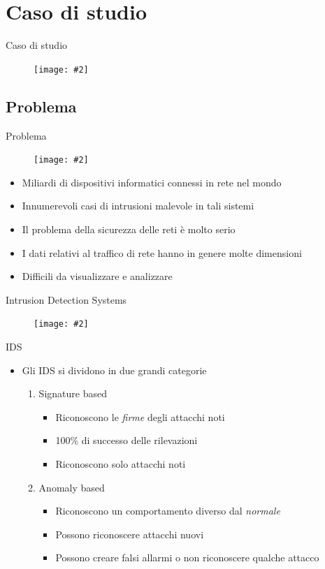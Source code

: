 \documentclass[xcolor={dvipsnames}]{beamer}
\newcommand{\figcen}[2]{
	\begin{figure}
		\begin{center}
			\texttt{[image: \#2]}
		\end{center}
	\end{figure}
}
\begin{document}
\section{Caso di studio}

	\begin{frame}{Caso di studio}
		\figcen{.85\textwidth}{caso}
	\end{frame}

	\subsection{Problema}

		\begin{frame}{Problema}
			\figcen{.5\textwidth}{iot}
			\begin{itemize}
				\item Miliardi di dispositivi informatici connessi in rete nel mondo
				\item Innumerevoli casi di intrusioni malevole in tali sistemi
				\item Il problema della sicurezza delle reti è molto serio
				\item I dati relativi al traffico di rete hanno in genere molte dimensioni
				\item Difficili da visualizzare e analizzare
			\end{itemize}
		\end{frame}
		
		\begin{frame}{Intrusion Detection Systems}
			\figcen{.5\textwidth}{guardia}
		\end{frame}

		\begin{frame}{IDS}
			\begin{itemize}
				\item Gli IDS si dividono in due grandi categorie\\
				\begin{enumerate}
					\item Signature based
					\begin{itemize}
						\item Riconoscono le \emph{firme} degli attacchi noti
						\item 100\% di successo delle rilevazioni
						\item Riconoscono solo attacchi noti
					\end{itemize}
					\item Anomaly based
					\begin{itemize}
						\item Riconoscono un comportamento diverso dal \emph{normale}
						\item Possono riconoscere attacchi nuovi
						\item Possono creare falsi allarmi o non riconoscere qualche attacco
					\end{itemize}
				\end{enumerate}
			\end{itemize}
		\end{frame}
\end{document}

